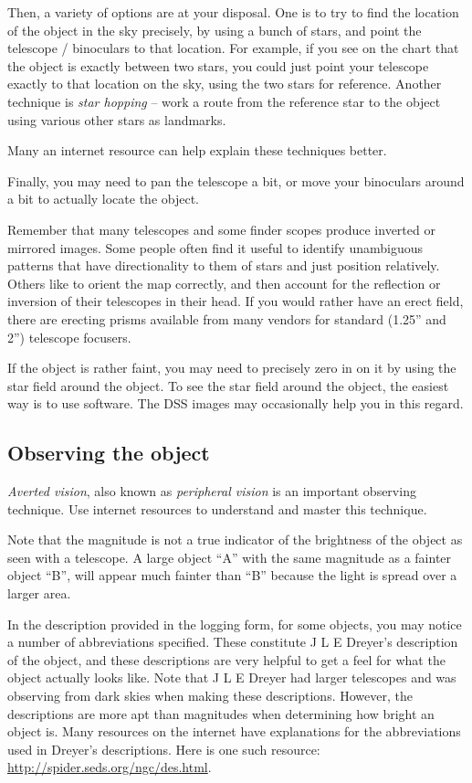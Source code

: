 Then, a variety of options are at your disposal. One is to try to find
the location of the object in the sky precisely, by using a bunch of
stars, and point the telescope / binoculars to that location. For
example, if you see on the chart that the object is exactly between
two stars, you could just point your telescope exactly to that
location on the sky, using the two stars for reference. Another
technique is \emph{star hopping} -- work a route from the reference
star to the object using various other stars as landmarks.

Many an internet resource can help explain these techniques better.

Finally, you may need to pan the telescope a bit, or move your
binoculars around a bit to actually locate the object.

Remember that many telescopes and some finder scopes produce inverted
or mirrored images. Some people often find it useful to identify
unambiguous patterns that have directionality to them of stars and
just position relatively. Others like to orient the map correctly, and
then account for the reflection or inversion of their telescopes in
their head. If you would rather have an erect field, there are
erecting prisms available from many vendors for standard (1.25'' and
2'') telescope focusers.

If the object is rather faint, you may need to precisely zero in on it
by using the star field around the object. To see the star field
around the object, the easiest way is to use software. The DSS images
may occasionally help you in this regard.

\subsection{Observing the object}

\emph{Averted vision}, also known as \emph{peripheral vision} is an
important observing technique. Use internet resources to understand
and master this technique.

Note that the magnitude is not a true indicator of the brightness of
the object as seen with a telescope. A large object ``A'' with the
same magnitude as a fainter object ``B'', will appear much fainter
than ``B'' because the light is spread over a larger area.

In the description provided in the logging form, for some objects, you
may notice a number of abbreviations specified. These constitute J L E
Dreyer's description of the object, and these descriptions are very
helpful to get a feel for what the object actually looks like. Note
that J L E Dreyer had larger telescopes and was observing from dark
skies when making these descriptions. However, the descriptions are
more apt than magnitudes when determining how bright an object
is. Many resources on the internet have explanations for the
abbreviations used in Dreyer's descriptions. Here is one such
resource: \url{http://spider.seds.org/ngc/des.html}.

